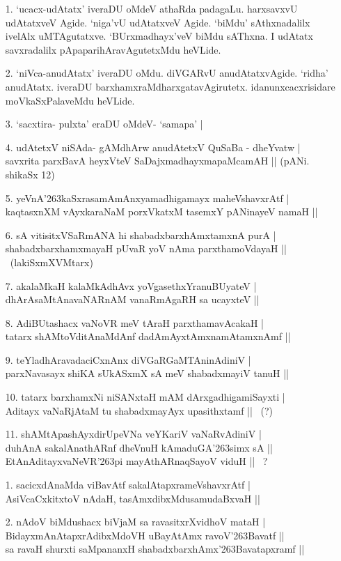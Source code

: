 \begin{itemize}
 \item[1.] `ucacx-udAtatx' iveraDU oMdeV athaRda padagaLu. harxsavxvU udAtatxveV Agide. `niga'vU udAtatxveV Agide. `biMdu' sAthxnadalilx ivelAlx uMTAgutatxve. `BUrxmadhayx'veV biMdu sAThxna. I udAtatx savxradalilx pApaparihAravAgutetxMdu heVLide.
 \item[2.] `niVca-anudAtatx' iveraDU oMdu. diVGARvU anudAtatxvAgide. `ridha' anudAtatx. iveraDU barxhamxraMdharxgatavAgirutetx. idanunxcacxrisidare moVkaSxPalaveMdu heVLide.
 \item[3.] `sacxtira- pulxta' eraDU oMdeV- `samapa' |
 \item[4.] udAtetxV niSAda- gAMdhArw anudAtetxV QuSaBa - dheYvatw |\\\label{156}
 savxrita parxBavA heyxVteV SaDajxmadhayxmapaMcamAH ||
 \hfill{(pANi. shikaSx 12)}
 \item[5.] yeVnA\char'263kaSxrasamAmAnxyamadhigamayx maheVshavxrAtf |\\\label{157}
 kaqtasxnXM vAyxkaraNaM porxVkatxM tasemxY pANinayeV namaH ||
 \item[6.] sA vitisitxVSaRmANA hi shabadxbarxhAmxtamxnA purA |\\\label{157}
 shabadxbarxhamxmayaH pUvaR yoV nAma parxthamoVdayaH || ~(lakiSxmXVMtarx)
 \item[7.] akalaMkaH kalaMkAdhAvx yoVgasethxYranuBUyateV |\\\label{157}
 dhArAsaMtAnavaNARnAM vanaRmAgaRH sa ucayxteV ||
 \item[8.] AdiBUtashacx vaNoVR meV tAraH parxthamavAcakaH |\\\label{157}
 tatarx shAMtoVditAnaMdAnf dadAmAyxtAmxnamAtamxnAmf ||
 \item[9.] teYladhAravadaciCxnAnx diVGaRGaMTAninAdiniV |\\
 parxNavasayx shiKA sUkASxmX sA meV shabadxmayiV tanuH ||
 \item[10.] tatarx barxhamxNi niSANxtaH mAM dArxgadhigamiSayxti |\\
 Aditayx vaNaRjAtaM tu shabadxmayAyx upasithxtamf || ~(?)
 \item[11.] shAMtApashAyxdirUpeVNa veYKariV vaNaRvAdiniV |\\
 duhAnA sakalAnathARnf dheVnuH kAmaduGA\char'263simx sA ||\\
 EtAnAditayxvaNeVR\char'263pi mayAthARnaqSayoV viduH || ~?
\end{itemize}

\begin{itemize}
\item[1.] sacicxdAnaMda viBavAtf sakalAtapxrameVshavxrAtf |\\\label{157}
AsiVcaCxkitxtoV nAdaH, tasAmxdibxMdusamudaBxvaH ||
\item[2.] nAdoV biMdushacx biVjaM sa ravasitxrXvidhoV mataH |\\
BidayxmAnAtapxrAdibxMdoVH uBayAtAmx ravoV\char'263Bavatf ||\\
sa ravaH shurxti saMpananxH shabadxbarxhAmx\char'263Bavatapxramf ||
\end{itemize}

